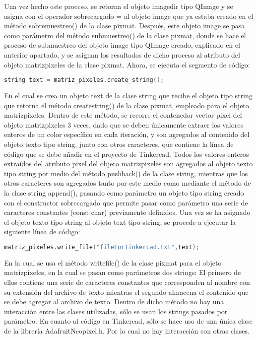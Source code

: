 \documentclass{article}
\begin{document}
Una vez hecho este proceso, se retorna el objeto imagedir tipo QImage y se asigna con el operador sobrecargado = al objeto image que ya estaba creado en el método sobremuestreo() de la clase pixmat. Después, este objeto image se pasa como parámetro del método submuestreo() de la clase pixmat, donde se hace el proceso de submuestreo del objeto image tipo QImage creado, explicado en el anterior apartado, y se asignan los resultados de dicho proceso al atributo del objeto matrizpixeles de la clase pixmat.
Ahora, se ejecuta el segmento de código: 
\begin{lstlisting}[language=C++, label=method_createstring]
string text = matriz_pixeles.create_string();
\end{lstlisting}
En el cual se crea un objeto text de la clase string que recibe el objeto tipo string que retorna el método createstring() de la clase pixmat, empleado para el objeto matrizpixeles. Dentro de este método, se recorre el contenedor vector pixel del objeto matrizpixeles 3 veces, dado que se deben únicamente extraer los valores enteros de un color específico en cada iteración, y son agregados al contenido del objeto texto tipo string, junto con otros caracteres, que contiene la línea de código que se debe añadir en el proyecto de Tinkercad. Todos los valores enteros extraídos del atributo pixel del objeto matrizpixeles son agregados al objeto texto tipo string por medio del método pushback() de la clase string, mientras que los otros caracteres son agregados tanto por este medio como mediante el método de la clase string append(), pasando como parámetro un objeto tipo string creado con el constructor sobrecargado que permite pasar como parámetro una serie de caracteres constantes (const char) previamente definidos.
Una vez se ha asignado el objeto texto tipo string al objeto text tipo string, se procede a ejecutar la siguiente línea de código:
\begin{lstlisting}[language=C++, label=method_writefile]
matriz_pixeles.write_file("fileForTinkercad.txt",text);
\end{lstlisting}
En la cual se usa el método writefile() de la clase pixmat para el objeto matrizpixeles, en la cual se pasan como parámetros dos strings: El primero de ellos contiene una serie de caracteres constantes que corresponden al nombre con su extensión del archivo de texto mientras el segundo almacena el contenido que se debe agregar al archivo de texto. Dentro de dicho método no hay una interacción entre las clases utilizadas, sólo se usan los strings pasados por parámetro.
En cuanto al código en Tinkercad, sólo se hace uso de una única clase de la librería AdafruitNeopixel.h. Por lo cual no hay interacción con otras clases.
\end{document}
